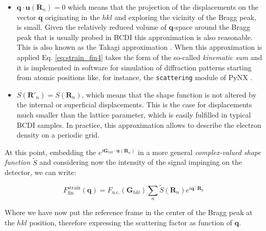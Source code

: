 \begin{itemize}

    \item $\mathbf{q}\cdot\mathbf{u}(\mathbf{R}_n) = 0 $ which means that the projection of the displacements on the vector 
    $\mathbf{q}$ originating in the $hkl$ and exploring the vicinity of the Bragg peak, is small. Given the relatively 
    reduced volume of $\mathbf{q}$-space around the Bragg peak that is usually probed in BCDI this approximation is 
    also reasonable. This is also known as the Takagi approximation \cite{takagi1969dynamical}. When this approximation is applied Eq. \ref{eq:strain_fin4} takes the form of the so-called \textit{kinematic sum}
    and it is implemented in software for simulation of diffraction 
    patterns starting from atomic positions like, for instance, the \texttt{scattering} module of PyNX \cite{pynx_scattering}. 

    \item $ S(\mathbf{R}'_n) = S(\mathbf{R}_n)$, which means that the shape function is not altered by the internal or superficial 
    displacements. This is the case for displacements much smaller than the lattice parameter, which is easily fulfilled in 
    typical BCDI samples. In practice, this approximation allows to describe the electron density on a periodic grid. 
     
\end{itemize}

At this point, embedding the $e^{i \mathbf{G}_{hkl} \cdot  \mathbf{u}(\mathbf{R}_n) }$ in a more general \textit{complex-valued 
shape function} $\tilde{S}$ and considering now the intensity of the signal impinging on the detector, we can write: 

\begin{equation}
    F^{\text{strain}}_{\text{fin}}(\mathbf{q}) = F_{\text{u.c.}}(\mathbf{G}_{hkl}) \sum_{n} \tilde{S}(\mathbf{R}_n) e^{i \mathbf{q} \cdot  \mathbf{R}_n }
    \label{eq:strain_fin4}
\end{equation}

Where we have now put the reference frame in the center of the Bragg peak at the $hkl$ position, therefore expressing 
the scattering factor as function of $\mathbf{q}$.


